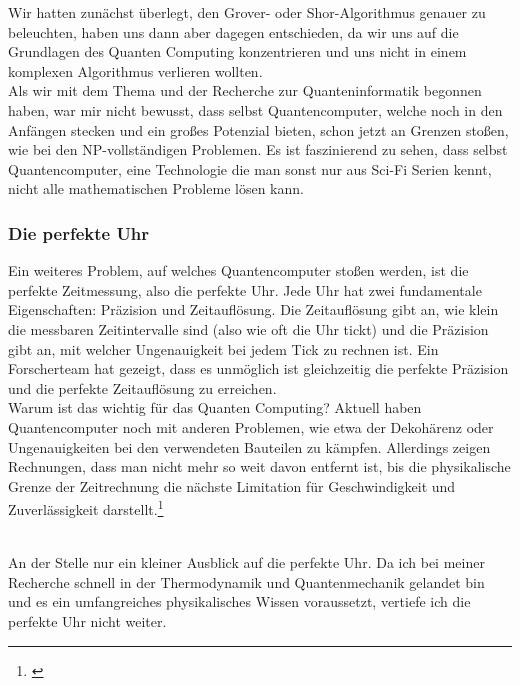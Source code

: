 \begin{tcolorbox}[title=Kommentar,
    title filled=false,
    colback=cyan!5!white,
    colframe=cyan!75!black]
    Wir hatten zunächst überlegt, den Grover- oder Shor-Algorithmus genauer zu beleuchten, haben uns dann aber dagegen entschieden,
    da wir uns auf die Grundlagen des Quanten Computing konzentrieren und uns nicht in einem komplexen Algorithmus verlieren wollten.\\

    Als wir mit dem Thema und der Recherche zur Quanteninformatik begonnen haben, war mir nicht bewusst, dass selbst Quantencomputer,
    welche noch in den Anfängen stecken und ein großes Potenzial bieten, schon jetzt an Grenzen stoßen, wie bei den NP-vollständigen Problemen.
    Es ist faszinierend zu sehen, dass selbst Quantencomputer, eine Technologie die man sonst nur aus Sci-Fi Serien kennt, nicht alle mathematischen Probleme lösen kann.
\end{tcolorbox}

\subsubsection{Die perfekte Uhr}
\label{subsubsec:die-perfekte-uhr}
Ein weiteres Problem, auf welches Quantencomputer stoßen werden, ist die perfekte Zeitmessung, also die perfekte Uhr.
Jede Uhr hat zwei fundamentale Eigenschaften: Präzision und Zeitauflösung.
Die Zeitauflösung gibt an, wie klein die messbaren Zeitintervalle sind (also wie oft die Uhr tickt) und die Präzision gibt an, mit welcher Ungenauigkeit bei jedem Tick zu rechnen ist.
Ein Forscherteam hat gezeigt, dass es unmöglich ist gleichzeitig die perfekte Präzision und die perfekte Zeitauflösung zu erreichen.\\

Warum ist das wichtig für das Quanten Computing?
Aktuell haben Quantencomputer noch mit anderen Problemen, wie etwa der Dekohärenz oder Ungenauigkeiten bei den verwendeten Bauteilen zu kämpfen.
Allerdings zeigen Rechnungen, dass man nicht mehr so weit davon entfernt ist, bis die physikalische Grenze der Zeitrechnung die nächste Limitation für Geschwindigkeit und Zuverlässigkeit darstellt.\footnote{\cite{tuwien_grenzen_2023}}\\\\

\begin{tcolorbox}[title=Kommentar,
    title filled=false,
    colback=cyan!5!white,
    colframe=cyan!75!black]
    An der Stelle nur ein kleiner Ausblick auf die perfekte Uhr.
    Da ich bei meiner Recherche schnell in der Thermodynamik und Quantenmechanik gelandet bin und es ein umfangreiches physikalisches Wissen voraussetzt, vertiefe ich die perfekte Uhr nicht weiter.
\end{tcolorbox}


